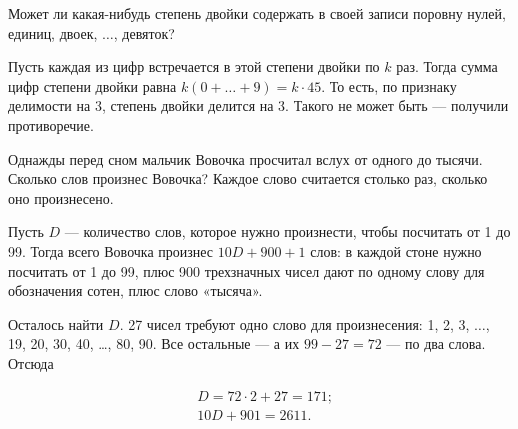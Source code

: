 \begin{itemize}

\itA Может ли какая-нибудь степень двойки содержать в своей записи поровну нулей, единиц, двоек, $\ldots$, девяток?

\itr Пусть каждая из цифр встречается в этой степени двойки по $k$ раз. Тогда сумма цифр степени двойки равна $k(0 + \ldots + 9) = k \cdot 45$. То есть, по признаку делимости на 3, степень двойки делится на 3. Такого не может быть — получили противоречие.

\itB Однажды перед сном мальчик Вовочка просчитал вслух от одного до тысячи. Сколько слов произнес Вовочка? Каждое слово считается столько раз, сколько оно произнесено.

\itr Пусть $D$ — количество слов, которое нужно произнести, чтобы посчитать от 1 до 99. Тогда всего Вовочка произнес $10D + 900 + 1$ слов: в каждой стоне нужно посчитать от 1 до 99, плюс 900 трехзначных чисел дают по одному слову для обозначения сотен, плюс слово «тысяча».

Осталось найти $D$. 27 чисел требуют одно слово для произнесения: 1, 2, 3, $\ldots$, 19, 20, 30, 40, \ldots, 80, 90. Все остальные — а их $99 - 27 = 72$ — по два слова. Отсюда

\begin{align*}
	& D = 72 \cdot 2 + 27 = 171; \\
	& 10D + 901 = 2611.
\end{align*}

\end{itemize}